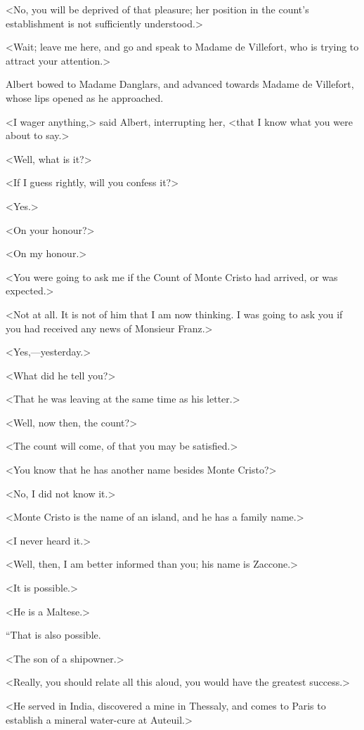  <No, you will be deprived of that pleasure; her position in the count's establishment is not sufficiently understood.> 

 <Wait; leave me here, and go and speak to Madame de Villefort, who is trying to attract your attention.> 

 Albert bowed to Madame Danglars, and advanced towards Madame de Villefort, whose lips opened as he approached. 

 <I wager anything,> said Albert, interrupting her, <that I know what you were about to say.> 

 <Well, what is it?> 

 <If I guess rightly, will you confess it?> 

 <Yes.> 

 <On your honour?> 

 <On my honour.> 

 <You were going to ask me if the Count of Monte Cristo had arrived, or was expected.> 

 <Not at all. It is not of him that I am now thinking. I was going to ask you if you had received any news of Monsieur Franz.> 

 <Yes,—yesterday.> 

 <What did he tell you?> 

 <That he was leaving at the same time as his letter.> 

 <Well, now then, the count?> 

 <The count will come, of that you may be satisfied.> 

 <You know that he has another name besides Monte Cristo?> 

 <No, I did not know it.> 

 <Monte Cristo is the name of an island, and he has a family name.> 

 <I never heard it.> 

 <Well, then, I am better informed than you; his name is Zaccone.> 

 <It is possible.> 

 <He is a Maltese.> 

 “That is also possible. 

 <The son of a shipowner.> 

 <Really, you should relate all this aloud, you would have the greatest success.> 

 <He served in India, discovered a mine in Thessaly, and comes to Paris to establish a mineral water-cure at Auteuil.> 


